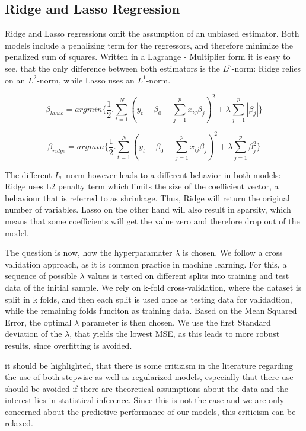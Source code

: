 \subsection{Ridge and Lasso Regression}
Ridge and Lasso regressions omit the assumption of an unbiased estimator. Both models include a penalizing term for the regressors, and therefore minimize the penalized sum of squares.  Written in a Lagrange - Multiplier form it is easy to see, that the only difference between both estimators is the $L^{p}$-norm: Ridge relies on an $L^{2}$-norm, while Lasso uses an  $L^{1}$-norm.  

\begin{equation}
\beta_{lasso}=argmin\{\frac{1}{2}.\sum_{t=1}^{N}(y_{t}-\beta_{0}-\sum_{j=1}^{p}x_{ij}\beta_{j})^{2}+\lambda\sum_{j=1}^{p}|\beta_{j}|\}
\end{equation}

\begin{equation}
\beta_{ridge}=argmin\{\frac{1}{2}.\sum_{t=1}^{N}(y_{t}-\beta_{0}-\sum_{j=1}^{p}x_{ij}\beta_{j})^{2}+\lambda\sum_{j=1}^{p}\beta_{j}^{2}\}
\end{equation}

The different $L_^{p}$ norm however leads to a different behavior in both models: Ridge uses L2 penalty term which limits the size of the coefficient vector, a behaviour that is referred to as shrinkage. Thus, Ridge will return the original number of variables.  Lasso on the other hand will also result in sparsity, which means that some coefficients will get the value zero and therefore drop out of the model. 

The question is now, how the hyperparamater $\lambda$ is chosen. We follow a cross validation approach, as it is common practice in machine learning. For this, a sequence of possible $\lambda$ values is tested on different splits into training and test data of the initial sample.  We rely on  k-fold cross-validation, where the dataset is split in k folds, and then each split is used once as testing data for validadtion, while the remaining folds funciton as training data. 
Based on the Mean Squared Error, the optimal $\lambda$ parameter is then chosen. We use the first Standard deviation of the $\lambda$, that yields the lowest MSE, as this leads to more robust results, since overfitting is avoided. 

it should be highlighted, that there is some critizism in the literature regarding the use of both stepwise as well as regularized models, especially that there use should be avoided if there are theoretical assumptions about the data and the interest lies in statistical inference. Since this is not the case and we are only concerned about the predictive performance of our models, this criticism can be relaxed. 


